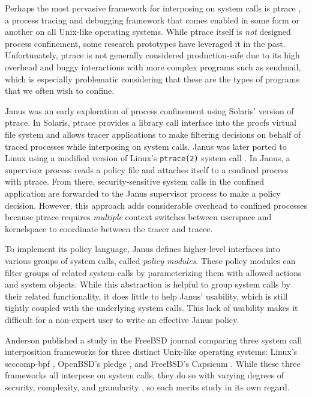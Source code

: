 Perhaps the most pervasive framework for interposing on system calls is ptrace \cite{padala2002_ptrace}, a process tracing and debugging framework that comes enabled in some form or another on all Unix-like operating systems.  While ptrace itself is \textit{not} designed process confinement, some research prototypes \cite{goldberg96_janus, wagner1999_janus} have leveraged it in the past. Unfortunately, ptrace is not generally considered production-safe due to its high overhead and buggy interactions with more complex programs such as sendmail, which is especially problematic considering that these are the types of programs that we often wish to confine.

Janus \cite{goldberg96_janus,wagner1999_janus} was an early exploration of process confinement using Solaris' version of ptrace. In Solaris, ptrace provides a library call interface into the procfs virtual file system and allows tracer applications to make filtering decisions on behalf of traced processes while interposing on system calls. Janus was later ported to Linux using a modified version of Linux's \texttt{ptrace(2)} system call \cite{wagner1999_janus}. In Janus, a supervisor process reads a policy file and attaches itself to a confined process with ptrace. From there, security-sensitive system calls in the confined application are forwarded to the Janus supervisor process to make a policy decision. However, this approach adds considerable overhead to confined processes because ptrace requires \textit{multiple} context switches between userspace and kernelspace to coordinate between the tracer and tracee.

To implement its policy language, Janus defines higher-level interfaces into various groups of system calls, called \textit{policy modules}. These policy modules can filter groups of related system calls by parameterizing them with allowed actions and system objects. While this abstraction is helpful to group system calls by their related functionality, it does little to help Janus' usability, which is still tightly coupled with the underlying system calls. This lack of usability makes it difficult for a non-expert user to write an effective Janus policy.

Anderson published a study in the FreeBSD journal \cite{anderson2017_comparison} comparing three system call interposition frameworks for three distinct Unix-like operating systems: Linux's seccomp-bpf \cite{seccomp_bpf, drewry2012_seccomp_bpf}, OpenBSD's pledge \cite{pledge}, and FreeBSD's Capsicum \cite{capsicum, watson2010_capsicum}. While these three frameworks all interpose on system calls, they do so with varying degrees of security, complexity, and granularity \cite{anderson2017_comparison}, so each merits study in its own regard.

